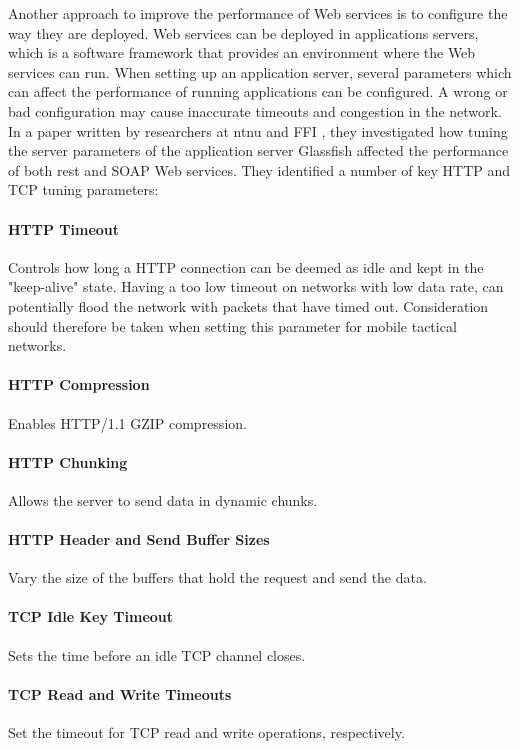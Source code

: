  Another approach to improve the performance of Web services is to configure
 the way they are deployed. Web services can be deployed in applications
 servers, which is a software framework that provides an environment where the
 Web services can run. When setting up an application server, several parameters
 which can affect the performance of running applications can be
 configured. A wrong or bad configuration may cause inaccurate timeouts and
 congestion in the network. In a paper written by researchers at \gls{ntnu} and
 FFI \cite{johnsen-recommendations}, they
 investigated how tuning the server parameters of the application server
 Glassfish affected the performance of both \gls{rest} and SOAP Web services.
 They identified a number of key HTTP and TCP tuning parameters:

\paragraph{HTTP Timeout} Controls how long a HTTP connection can be deemed as
idle and kept in the "keep-alive" state. Having a too low timeout on networks
with low data rate, can potentially flood the network with packets that have
timed out. Consideration should therefore be taken when setting this
parameter for mobile tactical networks.

\paragraph{HTTP Compression} Enables HTTP/1.1 GZIP compression.

\paragraph{HTTP Chunking} Allows the server to send data in dynamic chunks.

\paragraph{HTTP Header and Send Buffer Sizes} Vary the size of the buffers
that hold the request and send the data.

\paragraph{TCP Idle Key Timeout} Sets the time before an idle TCP channel
closes.

\paragraph{TCP Read and Write Timeouts} Set the timeout for TCP read and write
operations, respectively.

